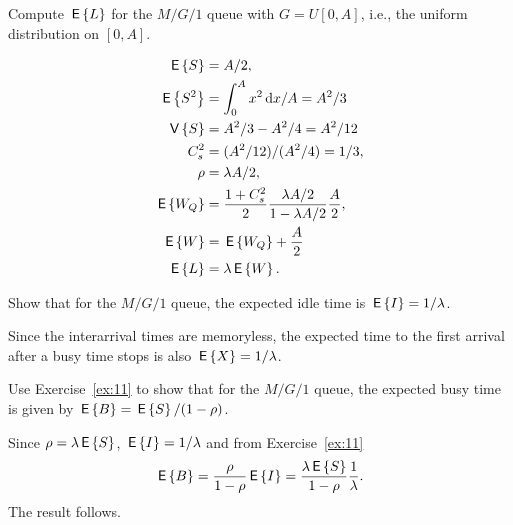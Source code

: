 \begin{question}
  Compute $\,\mathsf{E}\left\{L\right\}$ for the $M/G/1$ queue with $G=U[0,A]$, i.e., the
  uniform distribution on $[0,A]$.
\begin{solution}
  \begin{align*}
\,\mathsf{E}\left\{S\right\} &= A/2,\\
\,\mathsf{E}\left\{S^2\right\} &= \int_0^A x^2 \,\text{d}x/A = A^2/3\\
\,\mathsf{V}\left\{S\right\} &= A^2/3 - A^2/4= A^2/12\\
C_s^2 &= (A^2/12)/(A^2/4) = 1/3,\\
\rho &= \lambda A/2,\\
\,\mathsf{E}\left\{W_Q\right\} &= \frac{1+C_s^2}2 \frac{\lambda A/2}{1-\lambda A/2}\frac A2, \\
\,\mathsf{E}\left\{W\right\} &= \,\mathsf{E}\left\{W_Q\right\} + \frac A2\\
\,\mathsf{E}\left\{L\right\} &= \lambda \,\mathsf{E}\left\{W\right\}.
  \end{align*}
\end{solution}
\end{question}


\begin{question}
  Show that for the $M/G/1$ queue, the expected idle time is
  $\,\mathsf{E}\left\{I\right\} = 1/\lambda$.  
  \begin{solution}
  Since the interarrival times are memoryless, the expected
      time to the first arrival after a busy time stops is also
      $\,\mathsf{E}\left\{X\right\}=1/\lambda$.
  \end{solution}
\end{question}

\begin{question}
  Use Exercise~\ref{ex:11} to show that for the $M/G/1$ queue, the
  expected busy time is given by $\,\mathsf{E}\left\{B\right\} = \,\mathsf{E}\left\{S\right\}/(1-\rho)$.
  \begin{solution}
  Since $\rho = \lambda \,\mathsf{E}\left\{S\right\}$, $\,\mathsf{E}\left\{I\right\}= 1/\lambda$ and from Exercise~\ref{ex:11}
\begin{equation*}
  \,\mathsf{E}\left\{B\right\} = \frac{\rho }{1-\rho} \,\mathsf{E}\left\{I\right\} = \frac{\lambda \,\mathsf{E}\left\{S\right\}}{1-\rho} \frac1\lambda.
\end{equation*}
The result follows.
  \end{solution}
\end{question}

